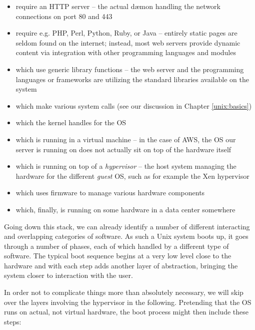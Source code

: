 \begin{itemize}
	\item require an HTTP server -- the actual d\ae mon
		handling the network connections on
		port 80 and 443
	\item require e.g. PHP, Perl, Python, Ruby, or Java --
		entirely static pages are seldom found
		on the internet; instead, most web
		servers provide dynamic content via
		integration with other programming
		languages and modules
	\item which use generic library functions --
		the web server and the programming
		languages or frameworks are utilizing
		the standard libraries available on
		the system
	\item which make various system calls (see
		our discussion in Chapter \ref{unix:basics})
	\item which the kernel handles for the OS
	\item which is running in a virtual machine --
		in the case of AWS, the OS our server is
		running on does not actually sit on
		top of the hardware itself
	\item which is running on top of a {\em
		hypervisor} -- the
		host system managing the hardware for
		the different {\em guest} OS, such as
		for example the Xen
		hypervisor
	\item which uses firmware to manage various
		hardware components
	\item which, finally, is running on some
		hardware in a data center somewhere
\end{itemize}

Going down this stack, we can already identify a number of
different interacting and overlapping categories of
software.  As such a Unix system boots up, it goes
through a number of phases, each of which handled by a
different type of software.  The typical boot sequence
begins at a very low level close to the hardware and
with each step adds another layer of abstraction,
bringing the system closer to interaction with the
user.

In order not to complicate things more than absolutely
necessary, we will skip over the layers involving the
hypervisor in the following.  Pretending that the OS
runs on actual, not virtual hardware, the boot process
might then include these steps:

